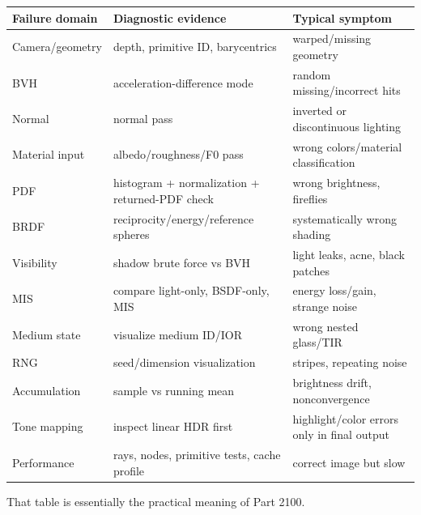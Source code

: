 {\def\LTcaptype{none} %
\begin{longtable}[]{@{}
  >{\raggedright\arraybackslash}p{}
  >{\raggedright\arraybackslash}p{}
  >{\raggedright\arraybackslash}p{}@{}}
\toprule\noalign{}
\begin{minipage}[b]{\linewidth}\raggedright
Failure domain
\end{minipage} & \begin{minipage}[b]{\linewidth}\raggedright
Diagnostic evidence
\end{minipage} & \begin{minipage}[b]{\linewidth}\raggedright
Typical symptom
\end{minipage} \\
\midrule\noalign{}
\endhead
\bottomrule\noalign{}
\endlastfoot
Camera/geometry & depth, primitive ID, barycentrics & warped/missing geometry \\
BVH & acceleration-difference mode & random missing/incorrect hits \\
Normal & normal pass & inverted or discontinuous lighting \\
Material input & albedo/roughness/F0 pass & wrong colors/material classification \\
PDF & histogram + normalization + returned-PDF check & wrong brightness, fireflies \\
BRDF & reciprocity/energy/reference spheres & systematically wrong shading \\
Visibility & shadow brute force vs BVH & light leaks, acne, black patches \\
MIS & compare light-only, BSDF-only, MIS & energy loss/gain, strange noise \\
Medium state & visualize medium ID/IOR & wrong nested glass/TIR \\
RNG & seed/dimension visualization & stripes, repeating noise \\
Accumulation & sample vs running mean & brightness drift, nonconvergence \\
Tone mapping & inspect linear HDR first & highlight/color errors only in final output \\
Performance & rays, nodes, primitive tests, cache profile & correct image but slow \\
\end{longtable}
}

That table is essentially the practical meaning of Part 2100.

